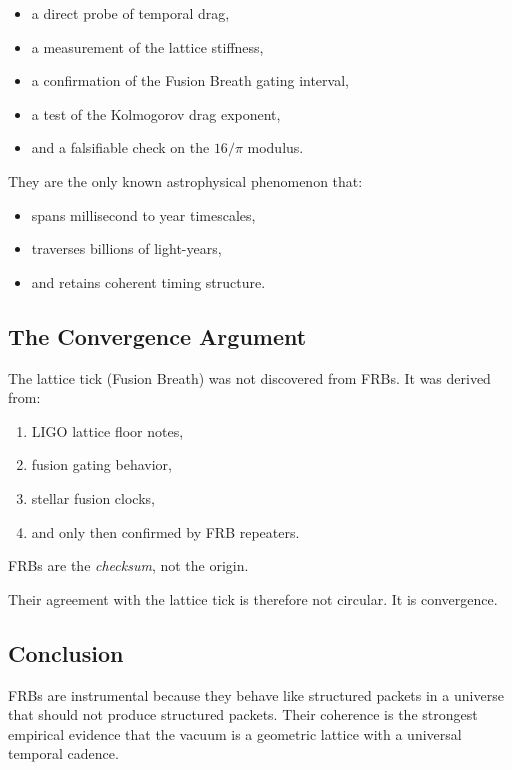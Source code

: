 \documentclass[12pt,oneside]{book}
\begin{document}
\begin{itemize}
    \item a direct probe of temporal drag,
    \item a measurement of the lattice stiffness,
    \item a confirmation of the Fusion Breath gating interval,
    \item a test of the Kolmogorov drag exponent,
    \item and a falsifiable check on the $16/\pi$ modulus.
\end{itemize}

They are the only known astrophysical phenomenon that:

\begin{itemize}
    \item spans millisecond to year timescales,
    \item traverses billions of light-years,
    \item and retains coherent timing structure.
\end{itemize}

\subsection{The Convergence Argument}
The lattice tick (Fusion Breath) was not discovered from FRBs.  
It was derived from:

\begin{enumerate}
    \item LIGO lattice floor notes,
    \item fusion gating behavior,
    \item stellar fusion clocks,
    \item and only then confirmed by FRB repeaters.
\end{enumerate}

FRBs are the \emph{checksum}, not the origin.

Their agreement with the lattice tick is therefore not circular.  
It is convergence.

\subsection{Conclusion}
FRBs are instrumental because they behave like structured packets in a universe that should not 
produce structured packets.  
Their coherence is the strongest empirical evidence that the vacuum is a geometric lattice with a 
universal temporal cadence.
\end{document}
